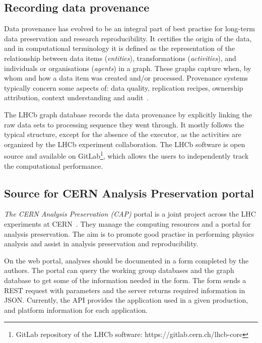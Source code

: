 \subsection{Recording data provenance}

Data provenance has evolved to be an integral part of best practise for long-term data preservation and research reproducibility. It certifies the origin of the data, and in computational terminology it is defined as the representation of the relationship between data items (\emph{entities}), transformations (\emph{activities}), and individuals or organisations (\emph{agents}) in a graph. These graphs capture when, by whom and how a data item was created and/or processed. Provenance systems typically concern some aspects of: data quality, replication recipes, ownership attribution, context understanding and audit~\cite{simmhan2005survey}.

The LHCb graph database records the data provenance by explicitly linking the raw data sets to processing sequence they went through. It mostly follows the typical structure, except for the absence of the executor, as the activities are organized by the LHCb experiment collaboration. The LHCb software is open source and available on GitLab\footnote{GitLab repository of the LHCb software: https://gitlab.cern.ch/lhcb-core}, which allows the users to independently track the computational performance. %

\subsection{Source for CERN Analysis Preservation portal}

\emph{The CERN Analysis Preservation (CAP)} portal is a joint project across the LHC experiments at CERN~\cite{dallmeiercern}. They manage the computing resources and a portal for analysis preservation. The aim is to promote good practise in performing physics analysis and assist in analysis preservation and reproducibility. 

On the web portal, analyses should be documented in a form completed by the authors. The portal can query the working group databases and the graph database to get some of the information needed in the form. The form sends a REST request with parameters and the server returns required information in JSON. Currently, the API provides the application used in a given production, and platform information for each application.

